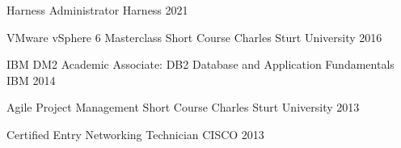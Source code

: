 

\begin{cvhonors}

  \cvhonor
  {Harness Administrator} %
  {Harness} %
  {} %
  {2021} %

  \cvhonor
  {VMware vSphere 6 Masterclass Short Course} %
  {Charles Sturt University} %
  {} %
  {2016} %

  \cvhonor
  {IBM DM2 Academic Associate: DB2 Database and Application Fundamentals} %
  {IBM} %
  {} %
  {2014} %

  \cvhonor
  {Agile Project Management Short Course} %
  {Charles Sturt University} %
  {} %
  {2013} %

  \cvhonor
  {Certified Entry Networking Technician} %
  {CISCO} %
  {} %
  {2013} %


\end{cvhonors}

